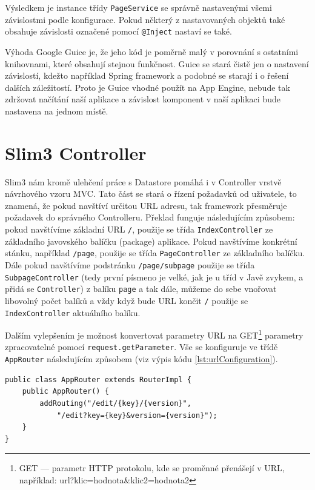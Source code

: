 Výsledkem je instance třídy \verb|PageService| se správně nastavenými všemi závislostmi podle konfigurace. Pokud některý z nastavovaných objektů  také obsahuje závislosti označené pomocí \verb|@Inject| nastaví se také.

Výhoda Google Guice je, že jeho kód je poměrně malý v porovnání s ostatními knihovnami, které obsahují stejnou funkčnost. Guice se stará čistě jen o nastavení závislostí, kdežto například Spring framework a podobné se starají i o řešení dalších záležitostí. Proto je Guice vhodné použít na App Engine, nebude tak zdržovat načítání naší aplikace a závislost komponent v naší aplikaci bude nastavena na jednom místě.

\section{Slim3 Controller}
Slim3 nám kromě ulehčení práce s Datastore pomáhá i v Controller vrstvě návrhového vzoru MVC. Tato část se stará o řízení požadavků od uživatele, to znamená, že pokud navštíví určitou URL adresu, tak framework přesměruje požadavek do správného Controlleru. Překlad funguje následujícím způsobem: pokud navštívíme základní URL \verb|/|, použije se třída \verb|IndexController| ze základního javovského balíčku (package) aplikace. Pokud navštívíme konkrétní stánku, například \verb|/page|, použije se třída \verb|PageController| ze základního balíčku. Dále pokud navštívíme podstránku \verb|/page/subpage| použije se třída \verb|SubpageController|  (tedy první písmeno je velké, jak je u tříd v Javě zvykem, a přidá se \verb|Controller|) z balíku \verb|page| a tak dále, můžeme do sebe vnořovat libovolný počet balíků a vždy když bude URL končit \verb|/| použije se \verb|IndexController| aktuálního balíku. 

Dalším vylepšením je možnost konvertovat parametry URL na GET\footnote{GET --- parametr HTTP protokolu, kde se proměnné přenášejí v URL, například: url?klic=hodnota\&klic2=hodnota2} parametry zpracovatelné pomocí \verb|request.getParameter|. Vše se konfiguruje ve třídě \verb|AppRouter| následujícím způsobem (viz výpis kódu \ref{lst:urlConfiguration}).

\begin{lstlisting}[caption={Konfigurace nastaveníURL},label=lst:urlConfiguration,belowcaptionskip=0.4cm]
public class AppRouter extends RouterImpl {
	public AppRouter() {
		addRouting("/edit/{key}/{version}", 
			"/edit?key={key}&version={version}");
	}
}
\end{lstlisting}

